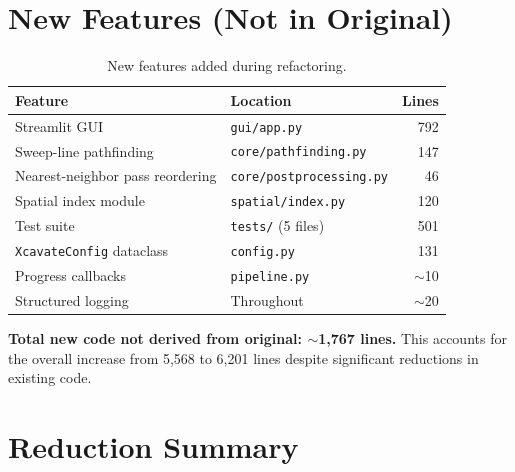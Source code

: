 \documentclass[11pt,letterpaper]{article}
\newcommand{\code}[1]{\texttt{#1}}
\begin{document}
\section{New Features (Not in Original)}

\begin{table}[h]
\centering
\small
\begin{tabular}{l l r}
\toprule
\textbf{Feature} & \textbf{Location} & \textbf{Lines} \\
\midrule
Streamlit GUI                     & \code{gui/app.py}              & 792 \\
Sweep-line pathfinding            & \code{core/pathfinding.py}     & 147 \\
Nearest-neighbor pass reordering  & \code{core/postprocessing.py}  & 46 \\
Spatial index module              & \code{spatial/index.py}        & 120 \\
Test suite                        & \code{tests/} (5 files)        & 501 \\
\code{XcavateConfig} dataclass    & \code{config.py}               & 131 \\
Progress callbacks                & \code{pipeline.py}             & $\sim$10 \\
Structured logging                & Throughout                     & $\sim$20 \\
\bottomrule
\end{tabular}
\caption{New features added during refactoring.}
\end{table}

\textbf{Total new code not derived from original: $\sim$1,767 lines.} This accounts for the overall increase from 5,568 to 6,201 lines despite significant reductions in existing code.

\section{Reduction Summary}
\end{document}
